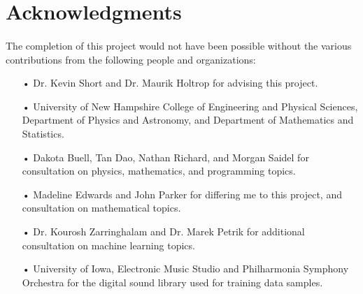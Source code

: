 \documentclass[12pt,letterpaper]{article}
\begin{document}

\newpage
\section{Acknowledgments}
\label{sec-Acknowledge}

\paragraph*{}The completion of this project would not have been possible without the various contributions from the following people and organizations:

\begin{itemize}

\item[•]Dr. Kevin Short and Dr. Maurik Holtrop for advising this project.

\item[•]University of New Hampshire College of Engineering and Physical Sciences, Department of Physics and Astronomy, and Department of Mathematics and Statistics.

\item[•]Dakota Buell, Tan Dao, Nathan Richard, and Morgan Saidel for consultation on physics, mathematics, and programming topics.

\item[•]Madeline Edwards and John Parker for differing me to this project, and consultation on mathematical topics.

\item[•]Dr. Kourosh Zarringhalam and Dr. Marek Petrik for additional consultation on machine learning topics.

\item[•]University of Iowa, Electronic Music Studio and Philharmonia Symphony Orchestra for the digital sound library used for training data samples.

\end{itemize}


\newpage
\end{document}

